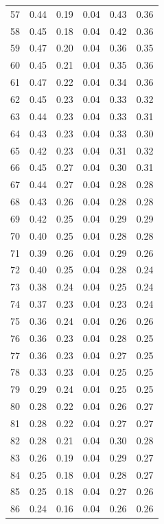 \documentclass[a4paper, 12pt]{article}
\begin{document}
\begin{tabularx}{\linewidth}{|X|X|X|X|X|X|}
        57 & 0.44 & 0.19 & 0.04 & 0.43 & 0.36 \\
        58 & 0.45 & 0.18 & 0.04 & 0.42 & 0.36 \\
        59 & 0.47 & 0.20 & 0.04 & 0.36 & 0.35 \\
        60 & 0.45 & 0.21 & 0.04 & 0.35 & 0.36 \\
        61 & 0.47 & 0.22 & 0.04 & 0.34 & 0.36 \\
        62 & 0.45 & 0.23 & 0.04 & 0.33 & 0.32 \\
        63 & 0.44 & 0.23 & 0.04 & 0.33 & 0.31 \\
        64 & 0.43 & 0.23 & 0.04 & 0.33 & 0.30 \\
        65 & 0.42 & 0.23 & 0.04 & 0.31 & 0.32 \\
        66 & 0.45 & 0.27 & 0.04 & 0.30 & 0.31 \\
        67 & 0.44 & 0.27 & 0.04 & 0.28 & 0.28 \\
        68 & 0.43 & 0.26 & 0.04 & 0.28 & 0.28 \\
        69 & 0.42 & 0.25 & 0.04 & 0.29 & 0.29 \\
        70 & 0.40 & 0.25 & 0.04 & 0.28 & 0.28 \\
        71 & 0.39 & 0.26 & 0.04 & 0.29 & 0.26 \\
        72 & 0.40 & 0.25 & 0.04 & 0.28 & 0.24 \\
        73 & 0.38 & 0.24 & 0.04 & 0.25 & 0.24 \\
        74 & 0.37 & 0.23 & 0.04 & 0.23 & 0.24 \\
        75 & 0.36 & 0.24 & 0.04 & 0.26 & 0.26 \\
        76 & 0.36 & 0.23 & 0.04 & 0.28 & 0.25 \\
        77 & 0.36 & 0.23 & 0.04 & 0.27 & 0.25 \\
        78 & 0.33 & 0.23 & 0.04 & 0.25 & 0.25 \\
        79 & 0.29 & 0.24 & 0.04 & 0.25 & 0.25 \\
        80 & 0.28 & 0.22 & 0.04 & 0.26 & 0.27 \\
        81 & 0.28 & 0.22 & 0.04 & 0.27 & 0.27 \\
        82 & 0.28 & 0.21 & 0.04 & 0.30 & 0.28 \\
        83 & 0.26 & 0.19 & 0.04 & 0.29 & 0.27 \\
        84 & 0.25 & 0.18 & 0.04 & 0.28 & 0.27 \\
        85 & 0.25 & 0.18 & 0.04 & 0.27 & 0.26 \\
        86 & 0.24 & 0.16 & 0.04 & 0.26 & 0.26 \\

\end{tabularx}
\end{document}
